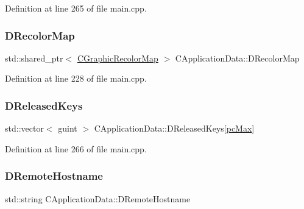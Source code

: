 Definition at line 265 of file main.\+cpp.

\hypertarget{classCApplicationData_afcbfb5d837afd5c117d91216d1988a53}{}\label{classCApplicationData_afcbfb5d837afd5c117d91216d1988a53} 
\subsubsection{\texorpdfstring{D\+Recolor\+Map}{DRecolorMap}}
{\footnotesize\ttfamily std\+::shared\+\_\+ptr$<$ \hyperlink{classCGraphicRecolorMap}{C\+Graphic\+Recolor\+Map} $>$ C\+Application\+Data\+::\+D\+Recolor\+Map\hspace{0.3cm}{\ttfamily [protected]}}



Definition at line 228 of file main.\+cpp.

\hypertarget{classCApplicationData_adcef59167cadd8ee516884a7c0df08f6}{}\label{classCApplicationData_adcef59167cadd8ee516884a7c0df08f6} 
\subsubsection{\texorpdfstring{D\+Released\+Keys}{DReleasedKeys}}
{\footnotesize\ttfamily std\+::vector$<$ guint $>$ C\+Application\+Data\+::\+D\+Released\+Keys\mbox{[}\hyperlink{GameDataTypes_8h_aafb0ca75933357ff28a6d7efbdd7602fa594a5c8dd3987f24e8a0f23f1a72cd34}{pc\+Max}\mbox{]}\hspace{0.3cm}{\ttfamily [protected]}}



Definition at line 266 of file main.\+cpp.

\hypertarget{classCApplicationData_a09da79011ab5ce6d6108d1c20f0e7c69}{}\label{classCApplicationData_a09da79011ab5ce6d6108d1c20f0e7c69} 
\subsubsection{\texorpdfstring{D\+Remote\+Hostname}{DRemoteHostname}}
{\footnotesize\ttfamily std\+::string C\+Application\+Data\+::\+D\+Remote\+Hostname\hspace{0.3cm}{\ttfamily [protected]}}



